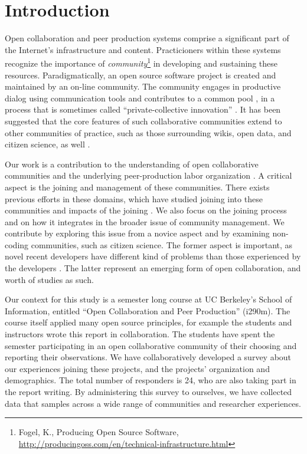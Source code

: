 \section{Introduction}

Open collaboration and peer production systems comprise a significant
part of the Internet's infrastructure and content.
Practicioners within these systems recognize the importance of
\emph{community}\footnote{Fogel, K., Producing Open Source Software, \url{http://producingoss.com/en/technical-infrastructure.html}} in developing and sustaining these resources.
Paradigmatically, an open source software project is created and maintained by an on-line community.
The community engages in productive dialog using communication tools and contributes to
a common pool \cite{ostrom1990}, in a process that is sometimes called ``private-collective innovation'' \cite{vonhippel2003oss}.
It has been suggested that the core features of such collaborative
communities extend to other communities of practice, such as those
surrounding wikis, open data, and citizen science, as well .

Our work is a contribution to the understanding of  open collaborative
communities and the underlying peer-production labor organization \cite{benkler2002} .
A critical aspect is the joining and management of these communities. There exists previous efforts in these domains, which have studied joining into these communities and impacts of the joining \cite{vonKrogh2003,Baldwin2006} .
We also focus on the joining process and on how
it integrates in the broader issue of community management.
We contribute by exploring this issue from a novice aspect and by examining non-coding communities, such as citizen science. The former aspect is important, as novel recent developers have different kind of problems than those experienced by the developers \cite{Begel2008}. The latter represent an emerging form of open collaboration, and worth of studies as such.

Our context for this study is a semester long course at UC Berkeley's School of Information, entitled ``Open Collaboration and Peer Production'' (i290m). The course itself applied many open source principles, for example
the students and instructors wrote this report in collaboration.
The students have spent the semester participating in an open
collaborative community of their choosing and reporting
their observations.
We have collaboratively developed a survey about our experiences joining
these projects, and the projects' organization and demographics. The total number of responders is 24, who are also taking part in the report writing.
By administering this survey to ourselves, we have collected data
that samples across a wide range of communities and researcher experiences.

